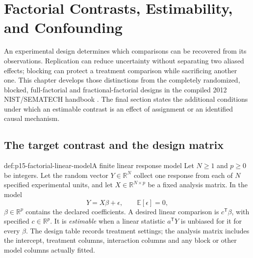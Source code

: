 \chapter{Factorial Contrasts, Estimability, and Confounding}
\label{sec:p15-factorial-inference}

An experimental design determines which comparisons can be recovered from
its observations. Replication can reduce uncertainty without separating two
aliased effects; blocking can protect a treatment comparison while sacrificing
another one. This chapter develops those distinctions from the completely
randomized, blocked, full-factorial and fractional-factorial designs in the
compiled 2012 NIST/SEMATECH handbook
\cite[\S\S5.3.3.1--5.3.3.4]{NISTSEMATECH2012DOE}.
The final section states the additional conditions under which an estimable
contrast is an effect of assignment or an identified causal mechanism.

\section{The target contrast and the design matrix}
\label{sec:p15-factorial-estimability}

\begin{hbdefinition}{def:p15-factorial-linear-model}{A finite linear response model}
Let \(N\geq1\) and \(p\geq0\) be integers. Let the random vector
\(Y\in\mathbb R^N\) collect one response from each of \(N\)
specified experimental units, and let \(X\in\mathbb R^{N\times p}\)
be a fixed analysis matrix. In the model
\[
 Y=X\beta+\epsilon,\qquad \mathbb E[\epsilon]=0,
\]
\(\beta\in\mathbb R^p\) contains the declared coefficients. A desired
linear comparison is \(c^{\mathsf T}\beta\), with specified
\(c\in\mathbb R^p\). It is \emph{estimable} when a linear statistic
\(a^{\mathsf T}Y\) is unbiased for it for every \(\beta\).
The design table records treatment settings; the analysis matrix includes
the intercept, treatment columns, interaction columns and any block or
other model columns actually fitted.
\end{hbdefinition}


